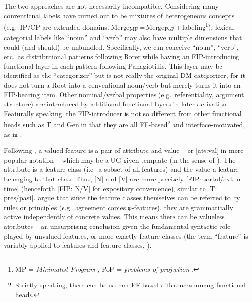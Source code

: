\documentclass[output=paper]{langsci/langscibook}
\begin{document}
The two approaches are not necessarily incompatible. Considering many
conventional labels have turned out to be mixtures of heterogeneous concepts
(e.g.\ IP/CP are extended domains,
Merge\textsubscript{MP}\,=\,Merge\textsubscript{PoP}\,+\,labeling\footnote{MP =
    {\em Minimalist Program} \citep{Chomsky1995}, PoP = {\em problems of
projection} \citep{Chomsky2013}.}), lexical categorial labels like ``noun'' and
``verb'' may also have multiple dimensions that could (and should) be
unbundled.  Specifically, we can conceive ``noun'', ``verb'', etc.\ as
distributional patterns following Borer while having an FIP-introducing
functional layer in each pattern following Panagiotidis. This layer may be
identified as the ``categorizer'' but is not really the original \gls{DM}
categorizer, for it does not turn a Root into a conventional noun/verb but
merely turns it into an FIP-bearing item. Other nominal/verbal properties
(e.g.\ referentiality, argument structure) are introduced by additional
functional layers in later derivation. Featurally speaking, the FIP-introducer
is not so different from other functional heads such as T and Gen in that they
are all FF-based\footnote{Strictly speaking, there can be no non-FF-based
    differences among functional heads.} and interface-motivated, as in
    .

\begin{table}
\caption{Parallelism between \gls{FIP} and other functional categories\label{tab:1:parallelism}}
\end{table}

Following \citet{AdgerSvenonius2011}, a valued feature is a pair of attribute
and value  -- or [att:val] in more popular notation -- which may
be a UG-given template (in the sense of \citealt{Biberauer2016}). The attribute
is a feature class (i.e.\ a subset of all features) and the value a feature
belonging to that class. Thus, [N] and [V] are more precisely [FIP:
sortal/ext-in-time] (henceforth [FIP: N/V] for expository convenience), similar
to [T: pres/past]. \citeauthor{AdgerSvenonius2011} argue that since the feature
classes themselves can be referred to by rules or principles (e.g.\ agreement
copies φ-features), they are grammatically active independently of
concrete values. This means there can be valueless attributes -- an
unsurprising conclusion given the fundamental syntactic role played by unvalued
features, or more exactly feature classes (the term ``feature'' is variably
applied to features and feature classes, \citealt[35]{AdgerSvenonius2011}).
\end{document}
